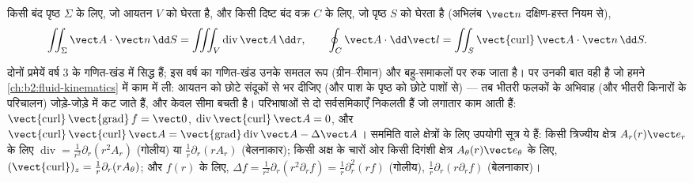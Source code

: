\begin{theorem}[अपसरण और स्टोक्स की प्रमेयें]\label{thm:b2:maxwell-equations:theorems}
किसी बंद पृष्ठ $\Sigma$ के लिए, जो आयतन $V$ को घेरता है, और किसी दिष्ट
बंद वक्र $C$ के लिए, जो पृष्ठ $S$ को घेरता है (अभिलंब $\vect n$ दक्षिण-हस्त नियम से),
\[
\iint_\Sigma\vect A\cdot\vect n\,\dd S = \iiint_V\operatorname{div}\vect A\,\dd\tau ,
\qquad
\oint_C\vect A\cdot\dd\vect l = \iint_S\operatorname{\vect{curl}}\vect A\cdot\vect n\,\dd S .
\]
\end{theorem}
\admitted

\begin{remark}[क्या स्वीकृत है और वह विश्वसनीय क्यों है]\label{rem:b2:maxwell-equations:whyadmitted}
दोनों प्रमेयें वर्ष 3 के गणित-खंड में सिद्ध हैं; इस वर्ष का
गणित-खंड उनके समतल रूप (ग्रीन--रीमान) और बहु-समाकलों पर रुक जाता है।
पर उनकी बात वही है जो हमने \cref{ch:b2:fluid-kinematics} में काम में ली:
आयतन को छोटे संदूकों से भर दीजिए (और पाश के पृष्ठ को छोटे पाशों से) ---
तब भीतरी फलकों के अभिवाह (और भीतरी किनारों के परिचालन)
जोड़े-जोड़े में कट जाते हैं, और केवल सीमा बचती है। परिभाषाओं से दो
सर्वसमिकाएँ निकलती हैं जो लगातार काम आती हैं:
$\operatorname{\vect{curl}}\operatorname{\vect{grad}}f = \vect 0$,
$\operatorname{div}\operatorname{\vect{curl}}\vect A = 0$, और
$\operatorname{\vect{curl}}\operatorname{\vect{curl}}\vect A = \operatorname{\vect{grad}}
\operatorname{div}\vect A - \Delta\vect A$। सममिति वाले क्षेत्रों के लिए
उपयोगी सूत्र ये हैं: किसी त्रिज्यीय क्षेत्र $A_r(r)\vect e_r$ के लिए $\operatorname{div}
= \frac1{r^2}\partial_r(r^2A_r)$ (गोलीय) या $\frac1r\partial_r(rA_r)$
(बेलनाकार); किसी अक्ष के चारों ओर किसी दिगंशी क्षेत्र $A_\theta(r)\vect e_\theta$ के
लिए, $(\operatorname{\vect{curl}})_z = \frac1r\partial_r(rA_\theta)$; और $f(r)$ के लिए,
$\Delta f = \frac1{r^2}\partial_r(r^2\partial_rf) = \frac1r\partial_r^2(rf)$ (गोलीय),
$\frac1r\partial_r(r\partial_rf)$ (बेलनाकार)।
\end{remark}

